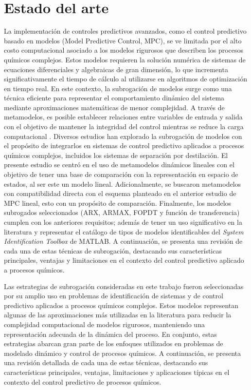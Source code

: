 \section{Estado del arte}

La implementación de controles predictivos avanzados, como el control predictivo basado en modelos (Model Predictive Control, MPC), se ve limitada por el alto costo computacional asociado a los modelos rigurosos que describen los procesos químicos complejos. Estos modelos requieren la solución numérica de sistemas de ecuaciones diferenciales y algebraicas de gran dimensión, lo que incrementa significativamente el tiempo de cálculo al utilizarse en algoritmos de optimización en tiempo real. En este contexto, la subrogación de modelos surge como una técnica eficiente para representar el comportamiento dinámico del sistema mediante aproximaciones matemáticas de menor complejidad. A través de metamodelos, es posible establecer relaciones entre variables de entrada y salida con el objetivo de mantener la integridad del control mientras se reduce la carga computacional \cite{ref6}. Diversos estudios han explorado la subrogación de modelos con el propósito de integrarlos en sistemas de control predictivo aplicados a procesos químicos complejos, incluidos los sistemas de separación por destilación. El presente estudio se centró en el uso de metamodelos dinámicos lineales con el objetivo de tener una base de comparación con la representación en espacio de estados, al ser este un modelo lineal. Adicionalmente, se buscaron metamodelos con compatibilidad directa con el esquema planteado en el anterior estudio de MPC lineal, esto con un propósito de comparación. Finalmente, los modelos subrogados seleccionados (ARX, ARMAX, FOPDT y función de transferencia) cumplen con los anteriores requisitos; además de tener un uso significativo en la literatura y representar el catálogo de tipos de modelos identificables del \textit{System Identification Toolbox} de MATLAB\textregistered{}. A continuación, se presenta una revisión de cada una de estas técnicas de subrogación, destacando sus características principales, ventajas y limitaciones en el contexto del control predictivo aplicado a procesos químicos.

\vspace{0.15cm}

Las estrategias de subrogación consideradas en este trabajo fueron seleccionadas por su amplio uso en problemas de identificación de sistemas y de control predictivo aplicados a procesos químicos complejos. Estos modelos representan algunas de las aproximaciones más utilizadas en la literatura para reducir la complejidad computacional de modelos rigurosos, manteniendo una representación adecuada de la dinámica del proceso. En conjunto, estas estrategias abarcan gran parte de los enfoques utilizados en problemas de modelado dinámico y control de procesos químicos. A continuación, se presenta una revisión detallada de cada una de estas técnicas, destacando sus características principales, ventajas, limitaciones y aplicaciones típicas en el contexto del control predictivo de procesos químicos.

